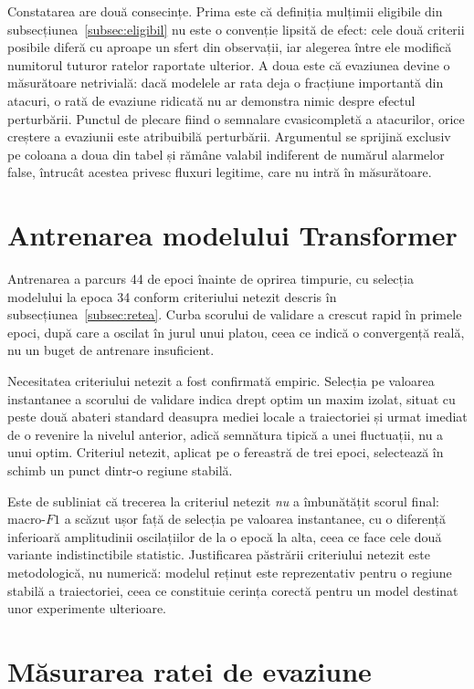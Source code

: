 Constatarea are două consecințe. Prima este că definiția mulțimii eligibile din subsecțiunea~\ref{subsec:eligibil} nu este o convenție lipsită de efect: cele două criterii posibile diferă cu aproape un sfert din observații, iar alegerea între ele modifică numitorul tuturor ratelor raportate ulterior. A doua este că evaziunea devine o măsurătoare netrivială: dacă modelele ar rata deja o fracțiune importantă din atacuri, o rată de evaziune ridicată nu ar demonstra nimic despre efectul perturbării. Punctul de plecare fiind o semnalare cvasicompletă a atacurilor, orice creștere a evaziunii este atribuibilă perturbării. Argumentul se sprijină exclusiv pe coloana a doua din tabel și rămâne valabil indiferent de numărul alarmelor false, întrucât acestea privesc fluxuri legitime, care nu intră în măsurătoare.

\section{Antrenarea modelului Transformer}\label{sec:rezultate-transformer}

Antrenarea a parcurs 44 de epoci înainte de oprirea timpurie, cu selecția modelului la epoca 34 conform criteriului netezit descris în subsecțiunea~\ref{subsec:retea}. Curba scorului de validare a crescut rapid în primele epoci, după care a oscilat în jurul unui platou, ceea ce indică o convergență reală, nu un buget de antrenare insuficient.

Necesitatea criteriului netezit a fost confirmată empiric. Selecția pe valoarea instantanee a scorului de validare indica drept optim un maxim izolat, situat cu peste două abateri standard deasupra mediei locale a traiectoriei și urmat imediat de o revenire la nivelul anterior, adică semnătura tipică a unei fluctuații, nu a unui optim. Criteriul netezit, aplicat pe o fereastră de trei epoci, selectează în schimb un punct dintr-o regiune stabilă.

Este de subliniat că trecerea la criteriul netezit \emph{nu} a îmbunătățit scorul final: macro-$F1$ a scăzut ușor față de selecția pe valoarea instantanee, cu o diferență inferioară amplitudinii oscilațiilor de la o epocă la alta, ceea ce face cele două variante indistinctibile statistic. Justificarea păstrării criteriului netezit este metodologică, nu numerică: modelul reținut este reprezentativ pentru o regiune stabilă a traiectoriei, ceea ce constituie cerința corectă pentru un model destinat unor experimente ulterioare.

\section{Măsurarea ratei de evaziune}\label{sec:rezultate-o3}

